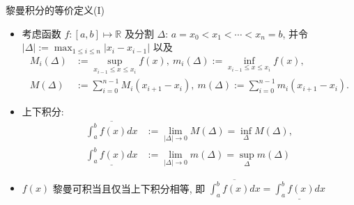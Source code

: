 \documentclass[Prob-All.tex]{subfiles}
\begin{document}
\begin{frame}{黎曼积分的等价定义(I)}
	\begin{itemize}[<+-|alert@+>]
		\item 考虑函数 $f:[a,b]\mapsto \mathbb{R}$ 及分割 $\Delta$: $a=x_0<x_1<\cdots<x_n=b$, 并令 $|\Delta|:=\max_{1\leq i\leq n}|x_i-x_{i-1}|$ 以及
		\begin{align*}
			M_i(\Delta)&:=\sup_{x_{i-1}\leq x\leq x_i}f(x), \  m_i(\Delta):=\inf_{x_{i-1}\leq x\leq x_i}f(x),\\
			M(\Delta)&:=\sum_{i=0}^{n-1}M_i(x_{i+1}-x_i), \ m(\Delta):=\sum_{i=0}^{n-1}m_i(x_{i+1}-x_i).
		\end{align*}
		\item 上下积分:
		\begin{align*}
			\overline{\int_a^bf(x)dx}&:=\lim_{|\Delta|\rightarrow 0}M(\Delta)=\inf_{\Delta} M(\Delta), \\
			\underline{\int_a^bf(x)dx}&:=\lim_{|\Delta|\rightarrow 0}m(\Delta)=\sup_{\Delta} m(\Delta)
		\end{align*}
		\item  $f(x)$ 黎曼可积当且仅当上下积分相等, 即	$\overline{\int_a^bf(x)dx}=\underline{\int_a^bf(x)dx}$
	\end{itemize}
\end{frame}
\end{document}
